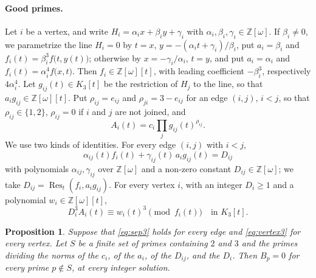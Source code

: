 \documentclass[11pt]{article}
\newtheorem{proposition}[theorem]{Proposition}
\newcommand{\Z}{\mathbb{Z}}
\begin{document}
\paragraph{Good primes.} Let $i$ be a vertex, and write $H_i=\alpha_ix+\beta_iy+\gamma_i$ with $\alpha_i,\beta_i,\gamma_i\in\Z[\omega]$. If $\beta_i\neq0$, we parametrize the line $H_i=0$ by $t=x$, $y=-(\alpha_it+\gamma_i)/\beta_i$, put $a_i=\beta_i$ and $f_i(t)=\beta_i^3f\bigl(t,y(t)\bigr)$; otherwise by $x=-\gamma_i/\alpha_i$, $t=y$, and put $a_i=\alpha_i$ and $f_i(t)=\alpha_i^4f\bigl(x,t\bigr)$. Then $f_i\in\Z[\omega][t]$, with leading coefficient $-\beta_i^3$, respectively $4\alpha_i^4$. Let $g_{ij}(t)\in K_3[t]$ be the restriction of $H_j$ to the line, so that $a_ig_{ij}\in\Z[\omega][t]$. Put $\rho_{ij}=e_{ij}$ and $\rho_{ji}=3-e_{ij}$ for an edge $(i,j)$, $i<j$, so that $\rho_{ij}\in\{1,2\}$, $\rho_{ij}=0$ if $i$ and $j$ are not joined, and
\[
A_i(t)=c_i\prod_jg_{ij}(t)^{\rho_{ij}}.
\]
We use two kinds of identities. For every edge $(i,j)$ with $i<j$,
\begin{equation}\label{eq:sep3}
\alpha_{ij}(t)f_i(t)+\gamma_{ij}(t)\,a_ig_{ij}(t)=D_{ij}
\end{equation}
with polynomials $\alpha_{ij},\gamma_{ij}$ over $\Z[\omega]$ and a non-zero constant $D_{ij}\in\Z[\omega]$; we take $D_{ij}=\operatorname{Res}_t(f_i,a_ig_{ij})$. For every vertex $i$, with an integer $D_i\geq1$ and a polynomial $w_i\in\Z[\omega][t]$,
\begin{equation}\label{eq:vertex3}
D_i^3A_i(t)\equiv w_i(t)^3\pmod{f_i(t)}\quad\text{in }K_3[t].
\end{equation}

\begin{proposition}\label{prop:good3}
Suppose that \eqref{eq:sep3} holds for every edge and \eqref{eq:vertex3} for every vertex. Let $S$ be a finite set of primes containing $2$ and $3$ and the primes dividing the norms of the $c_i$, of the $a_i$, of the $D_{ij}$, and the $D_i$. Then $B_p=0$ for every prime $p\notin S$, at every integer solution.
\end{proposition}
\end{document}
